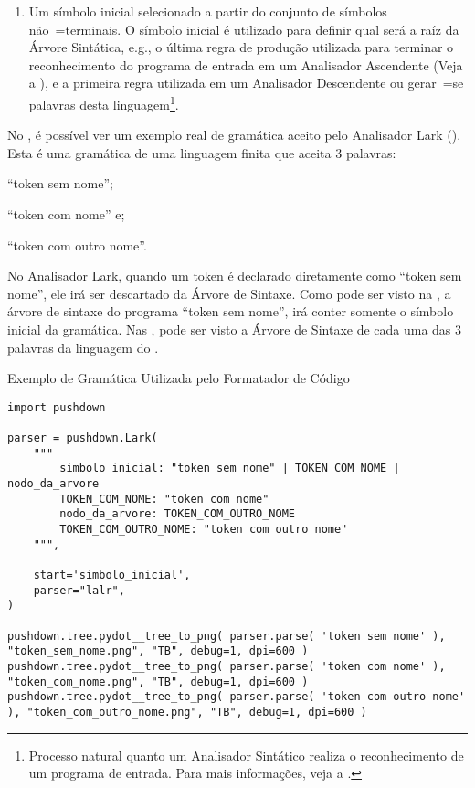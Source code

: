 \begin{enumerate}
    \item Um símbolo inicial selecionado a partir do conjunto de símbolos não~=terminais.
    O símbolo inicial é utilizado para definir qual será a raíz da Árvore Sintática,
    e.g.,
    o última regra de produção utilizada para terminar o reconhecimento do programa de entrada em um Analisador Ascendente (Veja a ),
    e a primeira regra utilizada em um Analisador Descendente ou
    gerar~=se palavras desta linguagem\footnote{
    Processo natural quanto um Analisador Sintático realiza o reconhecimento de um programa de entrada.
    Para mais informações,
    veja a .
    }.
\end{enumerate}

No ,
é possível ver um exemplo real de gramática aceito pelo Analisador Lark ().
Esta é uma gramática de uma linguagem finita que aceita 3 palavras:
\begin{inparaenum}[1)]
\item ``token sem nome'';
\item ``token com nome'' e;
\item ``token com outro nome''.
\end{inparaenum}%
No Analisador Lark,
quando um token é declarado diretamente como ``token sem nome'',
ele irá ser descartado da Árvore de Sintaxe.
Como pode ser visto na ,
a árvore de sintaxe do programa ``token sem nome'',
irá conter somente o símbolo inicial da gramática.
Nas ,
pode ser visto a Árvore de Sintaxe de cada uma das 3 palavras da linguagem do .
\begin{code}
\caption{Exemplo de Gramática Utilizada pelo Formatador de Código}
\label{code:ExemploDeGramaticaLark}
\begin{verbatim}
import pushdown

parser = pushdown.Lark(
    """
        simbolo_inicial: "token sem nome" | TOKEN_COM_NOME | nodo_da_arvore
        TOKEN_COM_NOME: "token com nome"
        nodo_da_arvore: TOKEN_COM_OUTRO_NOME
        TOKEN_COM_OUTRO_NOME: "token com outro nome"
    """,

    start='simbolo_inicial',
    parser="lalr",
)

pushdown.tree.pydot__tree_to_png( parser.parse( 'token sem nome' ), "token_sem_nome.png", "TB", debug=1, dpi=600 )
pushdown.tree.pydot__tree_to_png( parser.parse( 'token com nome' ), "token_com_nome.png", "TB", debug=1, dpi=600 )
pushdown.tree.pydot__tree_to_png( parser.parse( 'token com outro nome' ), "token_com_outro_nome.png", "TB", debug=1, dpi=600 )
\end{verbatim}
\end{code}
